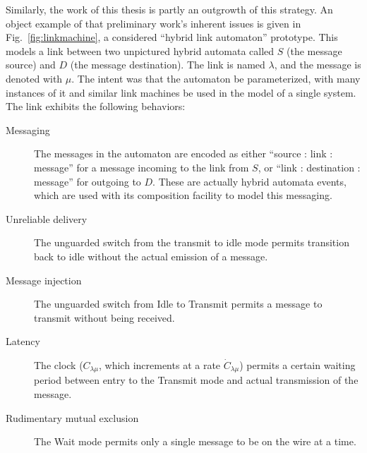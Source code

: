 Similarly, the work of this thesis is partly an outgrowth of 
this strategy. An object example of that preliminary work's inherent issues
is given in Fig.~\ref{fig:linkmachine},
a considered ``hybrid link automaton'' prototype. This models a link between two
unpictured hybrid automata called $S$ (the message source) and $D$ (the message
destination). The link is named $\lambda$, and the message is denoted with 
$\mu$. The intent was that the automaton be parameterized, with many instances
of it and similar link machines be used in the model of a single system.
The link exhibits the following behaviors:

\begin{description}
\item[Messaging] The messages in the automaton are encoded as either
    ``source : link : message'' for a message incoming to the link from $S$, or
    ``link : destination : message'' for outgoing to $D$. These are actually 
    hybrid automata events, which are used with its composition facility to 
    model this messaging.
\item[Unreliable delivery] The unguarded switch from the transmit to idle mode
    permits transition back to idle without the actual emission of a message.
\item[Message injection] The unguarded switch from Idle to Transmit permits a
    message to transmit without being received.
\item[Latency] The clock ($C_{\lambda\mu}$, which increments at a rate 
    $\dot{C}_{\lambda\mu}$) permits a certain waiting period between entry to
    the Transmit mode and actual transmission of the message.
\item[Rudimentary mutual exclusion] The Wait mode permits only a single
    message to be on the wire at a time.
\end{description}

